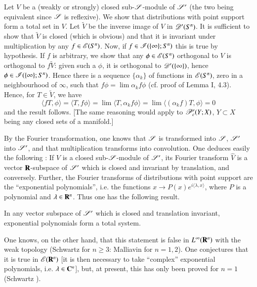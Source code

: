 Let $V$ be a (weakly or strongly) closed sub-$\mathscr{S}$-module of $\mathscr{S}'$ (the two being equivalent since $\mathscr{S}$ is reflexive). We show that distributions with point support form a total set in $V$. Let $\widetilde{V}$ be the inverse image of $V$ in $\mathscr{D}'(S^{n})$. It is sufficient to show that $\widetilde{V}$ is closed (which is obvious) and that it is invariant under multiplication by any $f\in \mathscr{E}(S^{n})$. Now, if $f\in \mathscr{I}(\{\infty\};S^{n})$ this is true by hypothesis. If $f$ is arbitrary, we show that any $\phi\in \mathscr{E}(S^{n})$ orthogonal to $V$ is orthogonal to $f\widetilde{V}$: given such a $\phi$, it is orthogonal to $\mathscr{D}'(\{\infty\})$, hence $\phi\in \mathscr{I}(\{\infty\};S^{n})$. Hence there is a sequence $\{\alpha_{k}\}$ of functions in $\mathscr{E}(S^{n})$, zero in a neighbourhood of $\infty$, such that $f\phi=\lim \alpha_{k}f\phi$ (cf. proof of Lemma I, 4.3). Hence, for $T\in\widetilde{V}$, we have
$$
\langle fT,\phi\rangle=\langle T,f\phi\rangle=\lim \langle T,\alpha_{k}f\phi\rangle=\lim \langle (\alpha_{k}f)T,\phi\rangle=0
$$
and the result follows. [The same reasoning would apply to $\mathscr{P}'_{c}(Y;X)$, $Y\subset X$ being any closed sets of a manifold.]

By the Fourier transformation, one knows that $\mathscr{S}$ is transformed into $\mathscr{S}$, $\mathscr{S}'$ into $\mathscr{S}'$, and that multiplication transforms into convolution. One deduces easily the following : If $V$ is a closed sub-$\mathscr{S}$-module of $\mathscr{S}'$, its Fourier transform $\widehat{V}$ is a vector $\mathbf{R}$-subspace of $\mathscr{S}'$ which is closed and invariant by translation, and conversely. Further, the Fourier transforms of distributions with point support are the ``exponential polynomials'', i.e. the functions $x\to P(x)e^{i\langle \lambda,x\rangle}$, where $P$ is a polynomial and $\lambda\in \mathbf{R}^{n}$. Thus one has the following result.

\begin{theorem}\label{chap7-thm3.2}
In any vector subspace of $\mathscr{S}'$ which is closed and translation invariant, exponential polynomials form a total system.
\end{theorem}

One knows, on the other hand, that this statement is false in $L^{\infty}(\mathbf{R}^{n})$ with the weak topology (Schwartz for $n\geq 3$: Malliavin for $n=1,2$). One conjectures that it is true in $\mathscr{E}(\mathbf{R}^{n})$ [it is then necessary to take ``complex'' exponential polynomials, i.e. $\lambda\in \mathbf{C}^{n}$], but, at present, this has only been proved for $n=1$ (Schwartz \cite{L. Schwartz : 3}).

